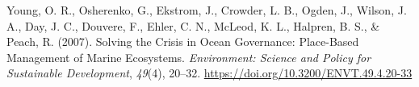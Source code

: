 \documentclass[
  12pt,
]{article}
\newlength{\cslhangindent}
\newlength{\cslentryspacingunit} %
\newenvironment{CSLReferences}[2] %
 {%
  \setlength{\parindent}{0pt}
  \ifodd #1
  \let\oldpar\par
  \def\par{\hangindent=\cslhangindent\oldpar}
  \fi
  \setlength{\parskip}{#2\cslentryspacingunit}
 }%
 {}
\begin{document}
\begin{CSLReferences}{1}{2}
\leavevmode{}%
Young, O. R., Osherenko, G., Ekstrom, J., Crowder, L. B., Ogden, J., Wilson, J. A., Day, J. C., Douvere, F., Ehler, C. N., McLeod, K. L., Halpren, B. S., \& Peach, R. (2007). Solving the {Crisis} in {Ocean Governance}: {Place-Based Management} of {Marine Ecosystems}. \emph{Environment: Science and Policy for Sustainable Development}, \emph{49}(4), 20--32. \url{https://doi.org/10.3200/ENVT.49.4.20-33}

\end{CSLReferences}
\end{document}
